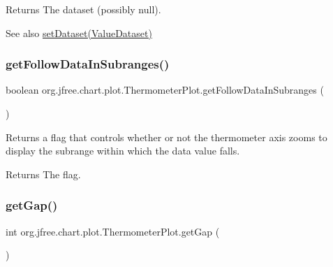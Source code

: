 \begin{DoxyReturn}{Returns}
The dataset (possibly {\ttfamily null}).
\end{DoxyReturn}
\begin{DoxySeeAlso}{See also}
\mbox{\hyperlink{classorg_1_1jfree_1_1chart_1_1plot_1_1_thermometer_plot_ac864201509947b48e4a47c5a18c7f2c8}{set\+Dataset(\+Value\+Dataset)}} 
\end{DoxySeeAlso}
\mbox{\label{classorg_1_1jfree_1_1chart_1_1plot_1_1_thermometer_plot_a9628ebdf3d4c6f3960a95929d4982aa1}} 
\subsubsection{\texorpdfstring{get\+Follow\+Data\+In\+Subranges()}{getFollowDataInSubranges()}}
{\footnotesize\ttfamily boolean org.\+jfree.\+chart.\+plot.\+Thermometer\+Plot.\+get\+Follow\+Data\+In\+Subranges (\begin{DoxyParamCaption}{ }\end{DoxyParamCaption})}

Returns a flag that controls whether or not the thermometer axis zooms to display the subrange within which the data value falls.

\begin{DoxyReturn}{Returns}
The flag. 
\end{DoxyReturn}
\mbox{\label{classorg_1_1jfree_1_1chart_1_1plot_1_1_thermometer_plot_a2a794babab6a5b7b75b792c19b39b3f5}} 
\subsubsection{\texorpdfstring{get\+Gap()}{getGap()}}
{\footnotesize\ttfamily int org.\+jfree.\+chart.\+plot.\+Thermometer\+Plot.\+get\+Gap (\begin{DoxyParamCaption}{ }\end{DoxyParamCaption})}

